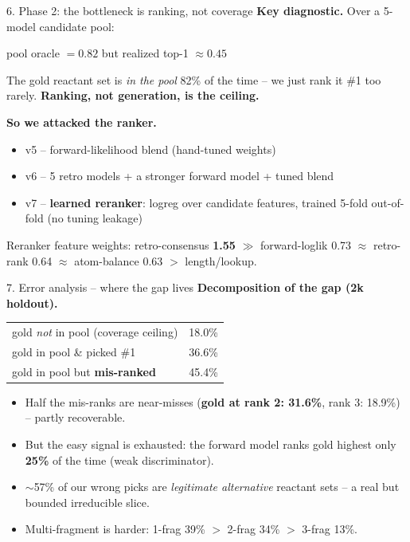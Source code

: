 \documentclass[aspectratio=169,11pt]{beamer}
\begin{document}
\begin{frame}{6. Phase 2: the bottleneck is ranking, not coverage}
  \textbf{Key diagnostic.} Over a 5-model candidate pool:
  \begin{center}
    \large
    pool oracle $= \mathbf{0.82}$ \quad but \quad realized top-1 $\approx 0.45$
  \end{center}
  The gold reactant set is \emph{in the pool} 82\% of the time -- we just rank
  it \#1 too rarely. \textbf{Ranking, not generation, is the ceiling.}

  \medskip
  \textbf{So we attacked the ranker.}
  \begin{itemize}
    \item v5 -- forward-likelihood blend (hand-tuned weights)
    \item v6 -- 5 retro models + a stronger forward model + tuned blend
    \item v7 -- \textbf{learned reranker}: logreg over candidate features,
      trained 5-fold out-of-fold (no tuning leakage)
  \end{itemize}

  \medskip
  Reranker feature weights: retro-consensus \textbf{1.55} $\gg$ forward-loglik
  0.73 $\approx$ retro-rank 0.64 $\approx$ atom-balance 0.63 $>$ length/lookup.
\end{frame}

\begin{frame}{7. Error analysis -- where the gap lives}
  \textbf{Decomposition of the gap (2k holdout).}
  \begin{center}
    \footnotesize
    \begin{tabular}{lr}
      \toprule
      gold \emph{not} in pool (coverage ceiling) & 18.0\% \\
      gold in pool \& picked \#1                  & 36.6\% \\
      gold in pool but \textbf{mis-ranked}        & 45.4\% \\
      \bottomrule
    \end{tabular}
  \end{center}

  \medskip
  \begin{itemize}
    \item Half the mis-ranks are near-misses (\textbf{gold at rank 2: 31.6\%},
      rank 3: 18.9\%) -- partly recoverable.
    \item But the easy signal is exhausted: the forward model ranks gold
      highest only \textbf{25\%} of the time (weak discriminator).
    \item $\sim$57\% of our wrong picks are \emph{legitimate alternative}
      reactant sets -- a real but bounded irreducible slice.
    \item Multi-fragment is harder: 1-frag 39\% $>$ 2-frag 34\% $>$ 3-frag 13\%.
  \end{itemize}
\end{frame}
\end{document}
